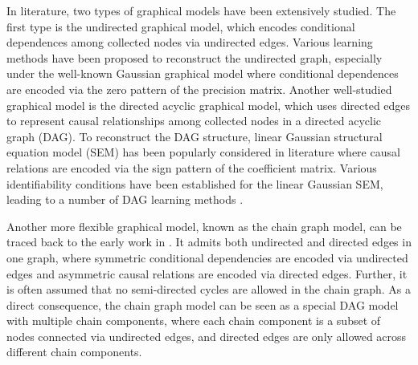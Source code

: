 \documentclass[12pt]{article}
\newcommand{\1}{\uppercase\expandafter{\romannumeral1}}
\newcommand{\2}{\uppercase\expandafter{\romannumeral2}}
\newcommand{\0}{\textbf{0}}
\begin{document}
In literature, two types of graphical models have been extensively studied. The first type is the undirected graphical model, which encodes conditional dependences among collected nodes via undirected edges. Various learning methods have been proposed to reconstruct the undirected graph, especially under the well-known Gaussian graphical model \cite{Friedman2008, Cai2011} where conditional dependences are encoded via the zero pattern of the precision matrix. Another well-studied graphical model is the directed acyclic graphical model, which uses directed edges to represent causal relationships among collected nodes in a directed acyclic graph (DAG).
To reconstruct the DAG structure, linear Gaussian structural equation model (SEM) has been popularly considered in literature where causal relations are encoded via the sign pattern of the coefficient matrix. Various identifiability conditions \cite{Peters2014, Park2020} have been established for the linear Gaussian SEM, leading to a number of DAG learning methods \cite{ChenW2019, Park2020}.

Another more flexible graphical model, known as the chain graph model, can be traced back to the early work in \cite{Lauritzen1989, Wermuth1990}. It admits both undirected and directed edges in one graph, where symmetric conditional dependencies are encoded via undirected edges and asymmetric causal relations are encoded via directed edges. Further, it is often assumed that no semi-directed cycles are allowed in the chain graph. As a direct consequence, the chain graph model can be seen as a special DAG model with multiple chain components, where each chain component is a subset of nodes connected via undirected edges, and directed edges are only allowed across different chain components.
\end{document}
